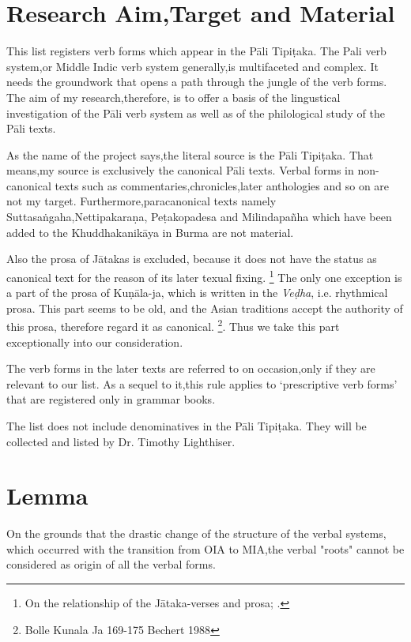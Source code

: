 \documentclass[11pt]{article}
\newcommand*\ṛ{r\symbol{"325}}
\newcommand*\Ṛ{R\symbol{"325}}
\newcommand*\ṝ{r\symbol{"304}\symbol{"325}}
\newcommand*\Ṝ{R\symbol{"304}\symbol{"325}}
\newcommand*\ḷ{l\symbol{"325}}
\newcommand*\ḹ{l\symbol{"304}\symbol{"325}}
\newcommand*\Ḷ{L\symbol{"325}}
\newcommand*\Ḹ{L\symbol{"304}\symbol{"325}}
\begin{document}


\section{Research Aim,Target and Material}
This list registers verb forms which appear in the Pāli Tipiṭaka.
The Pali verb system,or Middle Indic verb system generally,is multifaceted and complex.
It needs the groundwork that opens a path through the jungle of the verb forms.
The aim of my research,therefore,
is to offer a basis of the lingustical investigation of the Pāli verb system as well as of the philological study of the Pāli texts.

As the name of the project says,the literal source is the Pāli Tipiṭaka.
That means,my source is exclusively the canonical Pāli texts.
Verbal forms in non-canonical texts such as commentaries,chronicles,later anthologies and so on are not my target.
Furthermore,paracanonical texts namely Suttasaṅgaha,Nettipa\-ka\-raṇa,
Peṭakopadesa and Milindapañha which have been added to the Khuddhakanikāya in Burma are not material.

Also the prosa of Jātakas is excluded,
because it does not have the status as canonical text for the reason of its later texual fixing.%
\footnote{On the relationship of the Jātaka-verses and prosa; \citet[2-3]{vonhinueber:1998}.}
The only one exception is a part of the prosa of Kuṇāla-ja, which is written in the \textit{Veḍha}, i.e. rhythmical prosa.
This part seems to be old, and the Asian traditions accept the authority of this prosa, therefore regard it as canonical.%
\footnote{Bolle Kunala Ja 169-175 Bechert 1988}.
Thus we take this part exceptionally into our consideration.

The verb forms in the later texts are referred to on occasion,only if they are relevant to our list.
As a sequel to it,this rule applies to `prescriptive verb forms' that are registered only in grammar books.

The list does not include denominatives in the Pāli Tipiṭaka.
They will be collected and listed by Dr. Timothy Lighthiser.

\section{Lemma}
On the grounds that the drastic change of the structure of the verbal systems,
which occurred with the transition from OIA to MIA,the verbal "roots" cannot be considered as origin of all the verbal forms.
\end{document}
